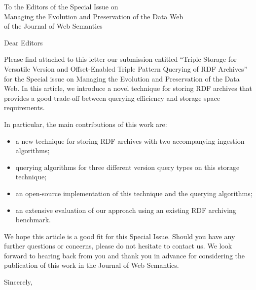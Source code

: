 \documentclass{letter}
\begin{document}
\begin{letter}{To the Editors of the Special Issue on\\Managing the Evolution and Preservation of the Data Web\\of the Journal of Web Semantics}
\opening{Dear Editors}

\null\vspace{\baselineskip}

{\parfillskip 0pt
Please find attached to this letter our submission entitled
\enquote{Triple Storage for Versatile Version and Offset-Enabled Triple Pattern Querying of RDF Archives}
for the Special issue on Managing the Evolution and Preservation of the Data Web.
In this article,
we introduce a novel technique for storing RDF archives
that provides a good trade-off between querying efficiency and storage space requirements.
}

In particular, the main contributions of this work are:
\begin{itemize}
  \item a new technique for storing RDF archives with two accompanying ingestion algorithms;
  \item querying algorithms for three different version query types on this storage technique;
  \item an open-source implementation of this technique and the querying algorithms;
  \item an extensive evaluation of our approach using an existing RDF archiving benchmark.
\end{itemize}

{\parfillskip 0pt
We hope this article is a good fit for this Special Issue.
Should you have any further questions or concerns, please do not hesitate to contact us.
We look forward to hearing back from you and thank you in advance
for considering the publication of this work in the Journal of Web Semantics.
}

\null\vspace{\baselineskip}

\closing{Sincerely,}

\end{letter}
\end{document}
